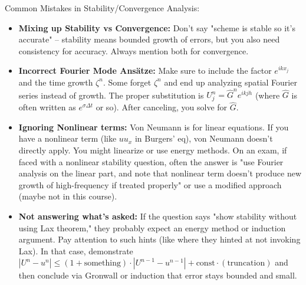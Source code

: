 \documentclass[a4paper,11pt]{report}
\begin{document}
\begin{pitfalls}{Common Mistakes in Stability/Convergence Analysis:}{}
    \begin{itemize}
        \item \textbf{Mixing up Stability vs Convergence:} Don't say "scheme is stable so it's accurate" -- stability means bounded growth of errors, but you also need consistency for accuracy. Always mention both for convergence.

        \item \textbf{Incorrect Fourier Mode Ans\"atze:} Make sure to include the factor $e^{ikx_j}$ and the time growth $\zeta^n$. Some forget $\zeta^n$ and end up analyzing spatial Fourier series instead of growth. The proper substitution is $U_j^n = \hat{G}^n e^{i k j h}$ (where $\hat{G}$ is often written as $e^{\sigma \Delta t}$ or so). After canceling, you solve for $\hat{G}$.

        \item \textbf{Ignoring Nonlinear terms:} Von Neumann is for linear equations. If you have a nonlinear term (like $u u_x$ in Burgers' eq), von Neumann doesn't directly apply. You might linearize or use energy methods. On an exam, if faced with a nonlinear stability question, often the answer is "use Fourier analysis on the linear part, and note that nonlinear term doesn't produce new growth of high-frequency if treated properly" or use a modified approach (maybe not in this course).

        \item \textbf{Not answering what's asked:} If the question says "show stability without using Lax theorem," they probably expect an energy method or induction argument. Pay attention to such hints (like where they hinted at not invoking Lax). In that case, demonstrate $|U^n - u^n| \le (1+ \text{something})\cdot|U^{n-1}-u^{n-1}| + \text{const}\cdot(\text{truncation})$ and then conclude via Gronwall or induction that error stays bounded and small.
    \end{itemize}
\end{pitfalls}

\printbibliography
\end{document}
